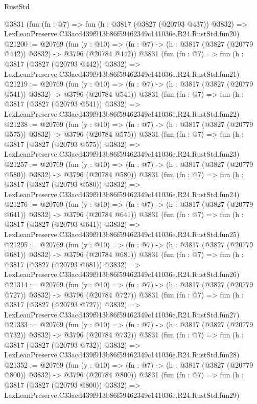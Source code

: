 \begin{lexlean}{RustStd}
\begin{coremodule}
    @3831
    (fun (fn : @7) =>
    fun (h : @3817 (@3827 (@20793 @437)) @3832) =>
    LexLeanPreserve.C33acd439f913b86f59462349c141036e.R24.RustStd.fun20)
@21200 := @20769
    (fun (y : @10) => (fn : @7) -> (h : @3817 (@3827 (@20779 @442)) @3832) -> @3796 (@20784 @442))
    @3831
    (fun (fn : @7) =>
    fun (h : @3817 (@3827 (@20793 @442)) @3832) =>
    LexLeanPreserve.C33acd439f913b86f59462349c141036e.R24.RustStd.fun21)
@21219 := @20769
    (fun (y : @10) => (fn : @7) -> (h : @3817 (@3827 (@20779 @541)) @3832) -> @3796 (@20784 @541))
    @3831
    (fun (fn : @7) =>
    fun (h : @3817 (@3827 (@20793 @541)) @3832) =>
    LexLeanPreserve.C33acd439f913b86f59462349c141036e.R24.RustStd.fun22)
@21238 := @20769
    (fun (y : @10) => (fn : @7) -> (h : @3817 (@3827 (@20779 @575)) @3832) -> @3796 (@20784 @575))
    @3831
    (fun (fn : @7) =>
    fun (h : @3817 (@3827 (@20793 @575)) @3832) =>
    LexLeanPreserve.C33acd439f913b86f59462349c141036e.R24.RustStd.fun23)
@21257 := @20769
    (fun (y : @10) => (fn : @7) -> (h : @3817 (@3827 (@20779 @580)) @3832) -> @3796 (@20784 @580))
    @3831
    (fun (fn : @7) =>
    fun (h : @3817 (@3827 (@20793 @580)) @3832) =>
    LexLeanPreserve.C33acd439f913b86f59462349c141036e.R24.RustStd.fun24)
@21276 := @20769
    (fun (y : @10) => (fn : @7) -> (h : @3817 (@3827 (@20779 @641)) @3832) -> @3796 (@20784 @641))
    @3831
    (fun (fn : @7) =>
    fun (h : @3817 (@3827 (@20793 @641)) @3832) =>
    LexLeanPreserve.C33acd439f913b86f59462349c141036e.R24.RustStd.fun25)
@21295 := @20769
    (fun (y : @10) => (fn : @7) -> (h : @3817 (@3827 (@20779 @681)) @3832) -> @3796 (@20784 @681))
    @3831
    (fun (fn : @7) =>
    fun (h : @3817 (@3827 (@20793 @681)) @3832) =>
    LexLeanPreserve.C33acd439f913b86f59462349c141036e.R24.RustStd.fun26)
@21314 := @20769
    (fun (y : @10) => (fn : @7) -> (h : @3817 (@3827 (@20779 @727)) @3832) -> @3796 (@20784 @727))
    @3831
    (fun (fn : @7) =>
    fun (h : @3817 (@3827 (@20793 @727)) @3832) =>
    LexLeanPreserve.C33acd439f913b86f59462349c141036e.R24.RustStd.fun27)
@21333 := @20769
    (fun (y : @10) => (fn : @7) -> (h : @3817 (@3827 (@20779 @732)) @3832) -> @3796 (@20784 @732))
    @3831
    (fun (fn : @7) =>
    fun (h : @3817 (@3827 (@20793 @732)) @3832) =>
    LexLeanPreserve.C33acd439f913b86f59462349c141036e.R24.RustStd.fun28)
@21352 := @20769
    (fun (y : @10) => (fn : @7) -> (h : @3817 (@3827 (@20779 @800)) @3832) -> @3796 (@20784 @800))
    @3831
    (fun (fn : @7) =>
    fun (h : @3817 (@3827 (@20793 @800)) @3832) =>
    LexLeanPreserve.C33acd439f913b86f59462349c141036e.R24.RustStd.fun29)

\end{coremodule}
\end{lexlean}
